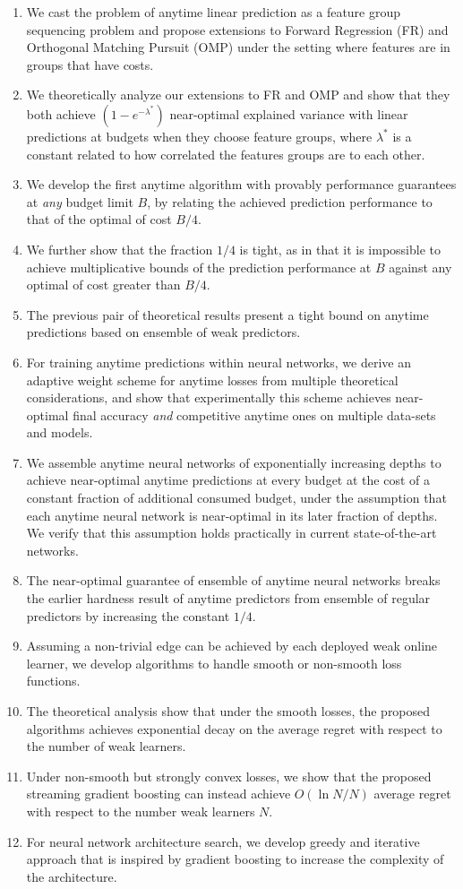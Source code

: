\begin{enumerate}
\item We cast the problem of anytime linear prediction 
as a feature group sequencing problem  
and propose extensions to Forward Regression (FR) and Orthogonal Matching Pursuit (OMP)
under the setting where features are in
groups that have costs. 
\item We theoretically analyze our extensions to FR and OMP 
and show that they both achieve $(1-e^{-\lambda^*})$ near-optimal 
explained variance with linear predictions at budgets when 
they choose feature groups, where $\lambda^*$ is a constant related to how correlated the 
features groups are to each other.
\item We develop the first anytime algorithm 
with provably performance guarantees at \textit{any} budget limit $B$, 
by relating the achieved prediction performance to that of the optimal of cost 
$B/4$. 
\item We further show that the fraction $1/4$ is tight, as in that it is 
impossible to achieve multiplicative bounds of the prediction performance at $B$ 
against any optimal of cost greater than $B/4$. 
\item The previous pair of theoretical results  present a tight bound on 
anytime predictions based on ensemble of weak predictors.
\item For training anytime predictions within neural networks, we derive an adaptive weight scheme for anytime losses from multiple theoretical considerations, and show that experimentally this scheme achieves near-optimal final accuracy \emph{and} competitive anytime ones on multiple data-sets and models.
\item We assemble anytime neural networks of exponentially increasing depths to achieve near-optimal anytime predictions at every budget at the cost of a constant fraction of additional consumed budget, under the assumption that each anytime neural network is near-optimal in its later fraction of depths. We verify that this assumption holds practically in current state-of-the-art networks.
\item The near-optimal guarantee of ensemble of anytime neural networks breaks the earlier hardness result of anytime predictors from ensemble of regular predictors by increasing the constant $1/4$. 
\item Assuming a non-trivial edge can be achieved by each deployed weak online learner, we develop algorithms to handle smooth or non-smooth loss functions. 
\item The theoretical analysis show that under the smooth losses, 
the proposed algorithms achieves exponential decay on the average regret with respect to the number of weak learners. 
\item Under non-smooth but strongly convex losses, we show that the proposed streaming gradient boosting can instead achieve $O(\ln N/N)$ average regret with respect to the number weak learners $N$. 
\item For neural network architecture search, we develop greedy and iterative approach that is inspired by gradient boosting to increase the complexity of the architecture.
\end{enumerate}
